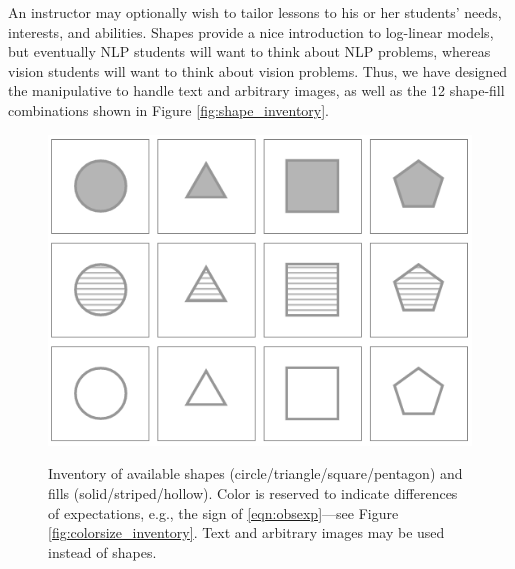 \documentclass[11pt,letterpaper]{article}
\begin{document}
An instructor may optionally wish to tailor lessons to his or her
students' needs, interests, and abilities.  Shapes provide a nice
introduction to log-linear models, but eventually NLP students will
want to think about NLP problems, whereas vision students will want to
think about vision problems.  Thus, we have designed the manipulative
to handle text and arbitrary images, as well as the 12 shape-fill
combinations shown in Figure \ref{fig:shape_inventory}.

\begin{figure}[t]
\begin{center}
\centering
\includegraphics[scale=.5]{images/different_shapes_fills3x4-allgray.PNG}
\caption{Inventory of available shapes
  (circle/triangle/square/pentagon) and fills (solid/striped/hollow).
 Color is reserved to indicate differences of expectations, e.g., 
 the sign of \eqref{eqn:obsexp}---see Figure \ref{fig:colorsize_inventory}.
  Text  and arbitrary images may be used instead of shapes.}
\label{fig:shape_inventory}
\label{fig:inventory}
\end{center}
\end{figure}
\end{document}
